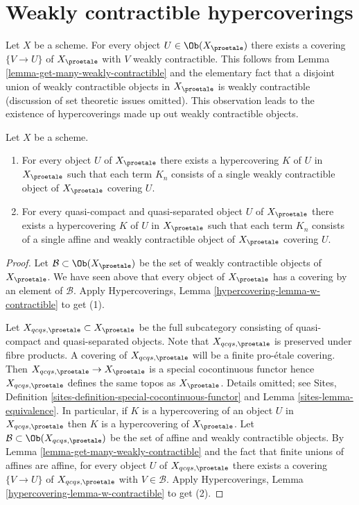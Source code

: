 \section{Weakly contractible hypercoverings}
\label{section-hypercovering}

\noindent
Let $X$ be a scheme. For every object $U \in \Ob(X_\proetale)$ there exists
a covering $\{V \to U\}$ of $X_\proetale$ with $V$ weakly contractible. This
follows from Lemma \ref{lemma-get-many-weakly-contractible} and the elementary
fact that a disjoint union of weakly contractible objects in $X_\proetale$
is weakly contractible (discussion of set theoretic issues omitted). This
observation leads to the existence of hypercoverings made up out weakly
contractible objects.

\begin{lemma}
\label{lemma-w-contractible-hypercovering}
Let $X$ be a scheme.
\begin{enumerate}
\item For every object $U$ of $X_\proetale$ there exists a hypercovering
$K$ of $U$ in $X_\proetale$ such that each term $K_n$ consists of a
single weakly contractible object of $X_\proetale$ covering $U$.
\item For every quasi-compact and quasi-separated object $U$ of $X_\proetale$
there exists a hypercovering $K$ of $U$ in $X_\proetale$ such that each
term $K_n$ consists of a single affine and weakly contractible object of
$X_\proetale$ covering $U$.
\end{enumerate}
\end{lemma}

\begin{proof}
Let $\mathcal{B} \subset \Ob(X_\proetale)$ be the
set of weakly contractible objects of $X_\proetale$.
We have seen above that every object of $X_\proetale$ has
a covering by an element of $\mathcal{B}$.
Apply Hypercoverings, Lemma \ref{hypercovering-lemma-w-contractible}
to get (1).

\medskip\noindent
Let $X_{qcqs, \proetale} \subset X_\proetale$ be the full subcategory
consisting of quasi-compact and quasi-separated objects. Note that
$X_{qcqs, \proetale}$ is preserved under fibre products. A covering of
$X_{qcqs, \proetale}$ will be a finite pro-\'etale covering.
Then $X_{qcqs, \proetale} \to X_\proetale$ is a special cocontinuous
functor hence $X_{qcqs, \proetale}$ defines the same topos as $X_\proetale$.
Details omitted; see
Sites, Definition \ref{sites-definition-special-cocontinuous-functor} and
Lemma \ref{sites-lemma-equivalence}.
In particular, if $K$ is a hypercovering of an object $U$ in
$X_{qcqs, \proetale}$ then $K$ is a hypercovering of $X_\proetale$.
Let $\mathcal{B} \subset \Ob(X_{qcqs, \proetale})$ be the set of
affine and weakly contractible objects. By 
Lemma \ref{lemma-get-many-weakly-contractible}
and the fact that finite unions of affines are affine,
for every object $U$ of $X_{qcqs, \proetale}$ there exists a covering
$\{V \to U\}$ of $X_{qcqs, \proetale}$ with $V \in \mathcal{B}$.
Apply Hypercoverings, Lemma \ref{hypercovering-lemma-w-contractible}
to get (2).
\end{proof}

